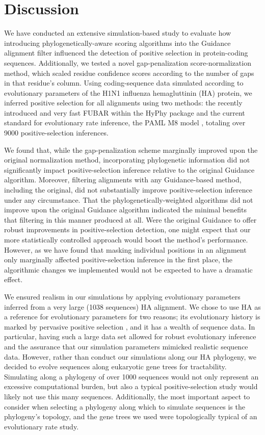 \documentclass[11pt]{article}
\begin{document}
\section*{Discussion}

We have conducted an extensive simulation-based study to evaluate how introducing phylogenetically-aware scoring algorithms into the Guidance alignment filter influenced the detection of positive selection in protein-coding sequences. Additionally, we tested a novel gap-penalization score-normalization method, which scaled residue confidence scores according to the number of gaps in that residue's column. Using coding-sequence data simulated according to evolutionary parameters of the H1N1 influenza hemagluttinin (HA) protein, we inferred positive selection for all alignments using two methods: the recently introduced and very fast FUBAR \citep{Murrell2013} within the HyPhy package \citep{Pond2005} and the current standard for evolutionary rate inference, the PAML M8 model \citep{Yang2007}, totaling over 9000 positive-selection inferences.

We found that, while the gap-penalization scheme marginally improved upon the original normalization method, incorporating phylogenetic information did not significantly impact positive-selection inference relative to the original Guidance algorithm. Moreover, filtering alignments with any Guidance-based method, including the original, did not substantially improve positive-selection inference under any circumstance. That the phylogenetically-weighted algorithms did not improve upon the original Guidance algorithm indicated the minimal benefits that filtering in this manner produced at all. Were the original Guidance to offer robust improvements in positive-selection detection, one might expect that our more statistically controlled approach would boost the method's performance. However, as we have found that masking individual positions in an alignment only marginally affected positive-selection inference in the first place, the algorithmic changes we implemented would not be expected to have a dramatic effect.

We ensured realism in our simulations by applying evolutionary parameters inferred from a very large (1038 sequences) HA alignment. We chose to use HA as a reference for evolutionary parameters for two reasons; its evolutionary history is marked by pervasive positive selection \citep{Bush1999, Kryazhimskiy2008, Meyer2012}, and it has a wealth of sequence data. In particular, having such a large data set allowed for robust evolutionary inference and the assurance that our simulation parameters mimicked realistic sequence data. However, rather than conduct our simulations along our HA phylogeny, we decided to evolve sequences along eukaryotic gene trees for tractability. Simulating along a phylogeny of over 1000 sequences would not only represent an excessive computational burden, but also a typical positive-selection study would likely not use this many sequences. Additionally, the most important aspect to consider when selecting a phylogeny along which to simulate sequences is the phylogeny's topology, and the gene trees we used were topologically typical of an evolutionary rate study.
\end{document}
